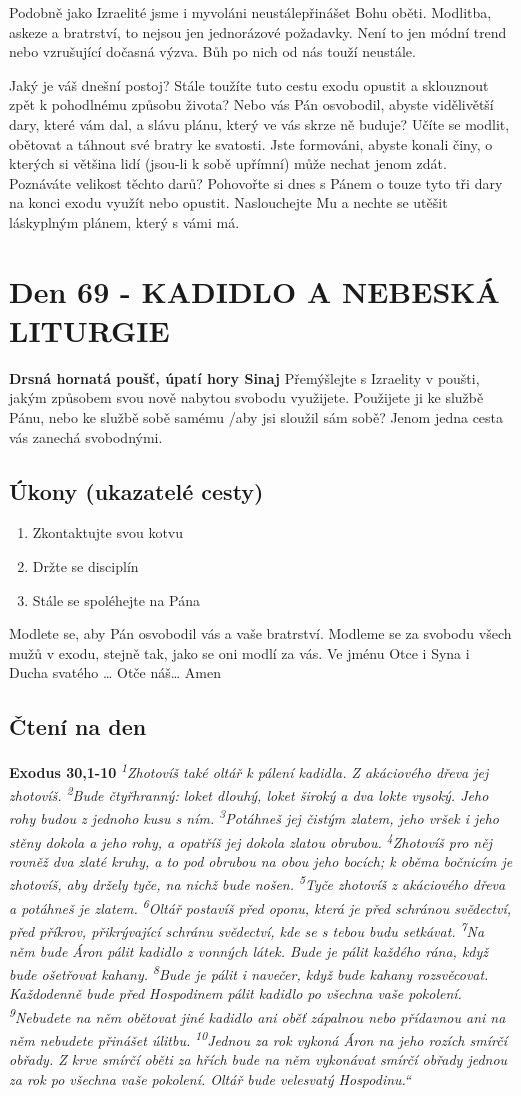 \documentclass[11pt]{article}
\newcommand{\zacatekDesatyTyden}{
\textbf{Drsná hornatá poušť, úpatí hory Sinaj} \newline 
Přemýšlejte s Izraelity v poušti, jakým způsobem svou nově nabytou svobodu využijete. Použijete ji ke službě Pánu, nebo ke službě sobě samému /aby jsi sloužil sám sobě? Jenom jedna cesta vás zanechá svobodnými.

\subsection*{Úkony (ukazatelé cesty)}
\begin{enumerate}
  \item Zkontaktujte svou kotvu
  \item Držte se disciplín
  \item Stále se spoléhejte na Pána
\end{enumerate}
Modlete se, aby Pán osvobodil vás a vaše bratrství. \newline
Modleme se za svobodu všech mužů v exodu, stejně tak, jako se oni modlí za vás.\newline
Ve jménu Otce i Syna i Ducha svatého …  Otče náš… Amen
}
\begin{document}
Podobně jako Izraelité jsme i myvoláni neustálepřinášet Bohu oběti. Modlitba, askeze a bratrství, to nejsou jen
jednorázové požadavky. Není to jen módní trend nebo vzrušující dočasná výzva. Bůh po nich od nás touží neustále.

Jaký je váš dnešní postoj? Stále toužíte tuto cestu exodu opustit a sklouznout zpět k pohodlnému způsobu života? Nebo
vás Pán osvobodil, abyste vidělivětší dary, které vám dal, a slávu plánu, který ve vás skrze ně buduje? Učíte se modlit,
obětovat a táhnout své bratry ke svatosti. Jste formováni, abyste konali činy, o kterých si většina lidí (jsou-li k sobě
upřímní) může nechat jenom zdát. Poznáváte velikost těchto darů? Pohovořte si dnes s Pánem o touze tyto tři dary na
konci exodu využít nebo opustit. Naslouchejte Mu a nechte se utěšit láskyplným plánem, který s vámi má.





\newpage
\section{Den 69 - KADIDLO A NEBESKÁ LITURGIE }
\zacatekDesatyTyden
\subsection*{Čtení na den}
\textbf{Exodus 30,1-10}
\newline
\textit{
\textsuperscript{1}Zhotovíš také oltář k pálení kadidla. Z akáciového dřeva jej zhotovíš.
\textsuperscript{2}Bude čtyřhranný: loket dlouhý, loket široký a dva lokte vysoký. Jeho rohy budou z jednoho kusu s ním.
\textsuperscript{3}Potáhneš jej čistým zlatem, jeho vršek i jeho stěny dokola a jeho rohy, a opatříš jej dokola zlatou obrubou.
\textsuperscript{4}Zhotovíš pro něj rovněž dva zlaté kruhy, a to pod obrubou na obou jeho bocích; k oběma bočnicím je zhotovíš, aby držely tyče, na nichž bude nošen.
\textsuperscript{5}Tyče zhotovíš z akáciového dřeva a potáhneš je zlatem.
\textsuperscript{6}Oltář postavíš před oponu, která je před schránou svědectví, před příkrov, přikrývající schránu svědectví, kde se s tebou budu setkávat.
\textsuperscript{7}Na něm bude Áron pálit kadidlo z vonných látek. Bude je pálit každého rána, když bude ošetřovat kahany.
\textsuperscript{8}Bude je pálit i navečer, když bude kahany rozsvěcovat. Každodenně bude před Hospodinem pálit kadidlo po všechna vaše pokolení.
\textsuperscript{9}Nebudete na něm obětovat jiné kadidlo ani oběť zápalnou nebo přídavnou ani na něm nebudete přinášet úlitbu.
\textsuperscript{10}Jednou za rok vykoná Áron na jeho rozích smírčí obřady. Z krve smírčí oběti za hřích bude na něm vykonávat smírčí obřady jednou za rok po všechna vaše pokolení. Oltář bude velesvatý Hospodinu.“
}
\end{document}
